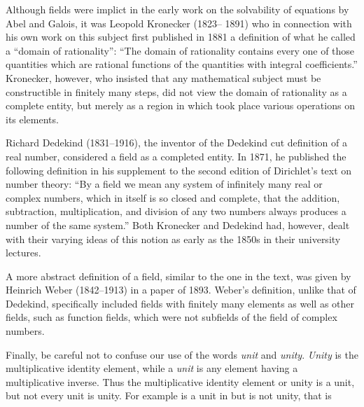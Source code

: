 \documentclass[11pt,oneside]{article}
\begin{document}
\begin{BookBody}

 \BookEnd{\blacksquare}

\noindent Although fields were implict in the early work on the solvability of equations by Abel and Galois, it was Leopold Kronecker (1823– 1891) who in connection with his own work on this subject first published in 1881 a definition of what he called a “domain of rationality”: “The domain of rationality  contains \BookInline{\cdots } every one of those quantities which are rational functions of the quantities  with integral coefficients.” Kronecker, however, who insisted that any mathematical subject must be constructible in finitely many steps, did not view the domain of rationality as a complete entity, but merely as a region in which took place various operations on its elements.

\noindent Richard Dedekind (1831–1916), the inventor of the Dedekind cut definition of a real number, considered a field as a completed entity. In 1871, he published the following definition in his supplement to the second edition of Dirichlet’s text on number theory: “By a field we mean any system of infinitely many real or complex numbers, which in itself is so closed and complete, that the addition, subtraction, multiplication, and division of any two numbers always produces a number of the same system.” Both Kronecker and Dedekind had, however, dealt with their varying ideas of this notion as early as the 1850s in their university lectures.

A more abstract definition of a field, similar to the one in the text, was given by Heinrich Weber (1842–1913) in a paper of 1893. Weber’s definition, unlike that of Dedekind, specifically included fields with finitely many elements as well as other fields, such as function fields, which were not subfields of the field of complex numbers.

Finally, be careful not to confuse our use of the words\textit{ unit} and\textit{ unity}.\textit{ Unity} is the multiplicative identity element, while a\textit{ unit} is any element having a multiplicative inverse. Thus the multiplicative identity element or unity is a unit, but not every unit is unity. For example is a unit in  but  is not unity, that is

\end{BookBody}
\end{document}
